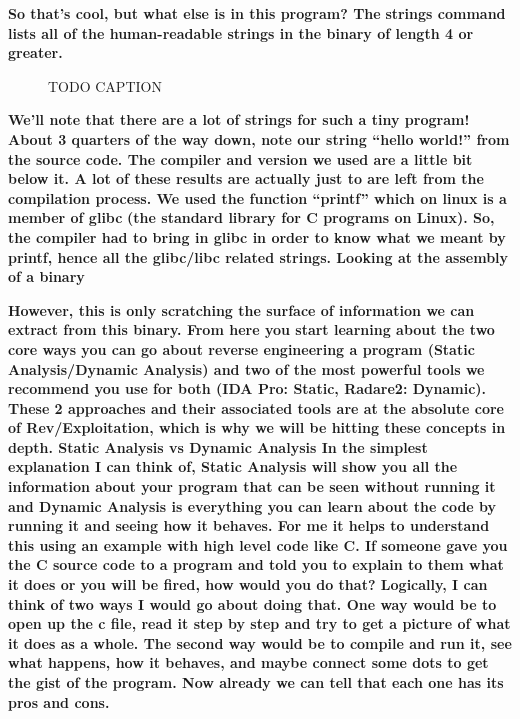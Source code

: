 \documentclass[letterpaper]{article}
\newcommand{\sitfig}[3]{
\begin{figure}[H]
\centering
\makebox[\textwidth][c]{
#2
}
\caption{#3}
\label{#1}
\end{figure}
}
\newcommand{\sitgfx}[4][scale=1.0]{
\sitfig{#3}{\texttt{[image: \#2]}}{#4}
}
\begin{document}
\textbf{So that's cool, but what else is in this program? The
}\textbf{\textcolor[rgb]{0.21960784,0.4627451,0.11372549}{strings }}\textbf{command lists all of the human-readable
strings in the binary of length 4 or greater. \newline
}  
\sitgfx[width=6.5in,height=3.5138in]{FINALWORKINGDOCFORMERLYPRECURSOR-img008.png}{fig:unk}{TODO CAPTION}
 \textbf{\newline
We'll note that there are a lot of strings for such a tiny program! About 3 quarters of the way down, note our string
``hello world!'' from the source code. The compiler and version we used are a little bit below it. A lot of these
results are actually just to are left from the compilation process. We used the function ``printf'' which on linux is a
member of}\textbf{\textcolor[rgb]{0.21960784,0.4627451,0.11372549}{ glibc}}\textbf{ (the standard library for C
programs on Linux). So, the compiler had to bring in glibc in order to know what we meant by printf, hence all the
glibc/libc related strings.\newline
\newline
{} Looking at the assembly of a binary}

\textbf{However, this is only scratching the surface of information we can extract from this binary. \newline
From here you start learning about the two core ways you can go about reverse engineering a program (Static
Analysis/Dynamic Analysis) and two of the most powerful tools we recommend you use for both (IDA Pro: Static, Radare2:
Dynamic). These 2 approaches and their associated tools are at the absolute core of Rev/Exploitation, which is why we
will be hitting these concepts in depth.\newline
{} Static Analysis vs Dynamic Analysis\newline
In the simplest explanation I can think of, Static Analysis will show you all the information about your program that
can be seen without running it and Dynamic Analysis is everything you can learn about the code by running it and seeing
how it behaves. For me it helps to understand this using an example with high level code like C. \newline
\newline
If someone gave you the C source code to a program and told you to explain to them what it does or you will be fired,
how would you do that? Logically, I can think of two ways I would go about doing that. One way would be to open up the
c file, read it step by step and try to get a picture of what it does as a whole. The second way would be to compile
and run it, see what happens, how it behaves, and maybe connect some dots to get the gist of the program. Now already
we can tell that each one has its pros and cons. }
\end{document}
